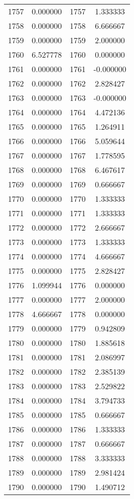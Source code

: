 \documentclass[12pt]{article}
\begin{document}
\begin{longtable}{@{}cccc@{}}
1757 & 0.000000 & 1757 & 1.333333 \\
1758 & 0.000000 & 1758 & 6.666667 \\
1759 & 0.000000 & 1759 & 2.000000 \\
1760 & 6.527778 & 1760 & 0.000000 \\
1761 & 0.000000 & 1761 & -0.000000 \\
1762 & 0.000000 & 1762 & 2.828427 \\
1763 & 0.000000 & 1763 & -0.000000 \\
1764 & 0.000000 & 1764 & 4.472136 \\
1765 & 0.000000 & 1765 & 1.264911 \\
1766 & 0.000000 & 1766 & 5.059644 \\
1767 & 0.000000 & 1767 & 1.778595 \\
1768 & 0.000000 & 1768 & 6.467617 \\
1769 & 0.000000 & 1769 & 0.666667 \\
1770 & 0.000000 & 1770 & 1.333333 \\
1771 & 0.000000 & 1771 & 1.333333 \\
1772 & 0.000000 & 1772 & 2.666667 \\
1773 & 0.000000 & 1773 & 1.333333 \\
1774 & 0.000000 & 1774 & 4.666667 \\
1775 & 0.000000 & 1775 & 2.828427 \\
1776 & 1.099944 & 1776 & 0.000000 \\
1777 & 0.000000 & 1777 & 2.000000 \\
1778 & 4.666667 & 1778 & 0.000000 \\
1779 & 0.000000 & 1779 & 0.942809 \\
1780 & 0.000000 & 1780 & 1.885618 \\
1781 & 0.000000 & 1781 & 2.086997 \\
1782 & 0.000000 & 1782 & 2.385139 \\
1783 & 0.000000 & 1783 & 2.529822 \\
1784 & 0.000000 & 1784 & 3.794733 \\
1785 & 0.000000 & 1785 & 0.666667 \\
1786 & 0.000000 & 1786 & 1.333333 \\
1787 & 0.000000 & 1787 & 0.666667 \\
1788 & 0.000000 & 1788 & 3.333333 \\
1789 & 0.000000 & 1789 & 2.981424 \\
1790 & 0.000000 & 1790 & 1.490712 \\

\end{longtable}
\end{document}
